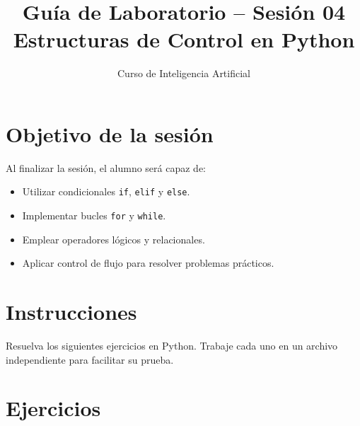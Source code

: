 \documentclass[12pt,a4paper]{article}
\title{\textbf{Guía de Laboratorio – Sesión 04} \\ Estructuras de Control en Python}
\author{Curso de Inteligencia Artificial}
\date{}
\begin{document}
\maketitle

\section*{Objetivo de la sesión}
Al finalizar la sesión, el alumno será capaz de:
\begin{itemize}
    \item Utilizar condicionales \texttt{if}, \texttt{elif} y \texttt{else}.
    \item Implementar bucles \texttt{for} y \texttt{while}.
    \item Emplear operadores lógicos y relacionales.
    \item Aplicar control de flujo para resolver problemas prácticos.
\end{itemize}

\section*{Instrucciones}
Resuelva los siguientes ejercicios en Python. Trabaje cada uno en un archivo independiente para facilitar su prueba.

\section*{Ejercicios}
\end{document}
